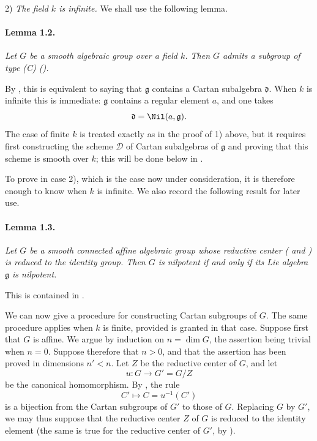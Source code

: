 \medskip
\noindent\textup{2\textdegree)} \emph{The field \(k\) is infinite.}
We shall use the following lemma.

\paragraph{\textbf{Lemma 1.2.}}
\emph{Let \(G\) be a smooth algebraic group over a field \(k\).
Then \(G\) admits a subgroup of type \textup{(C)}
\textup{()}.}

By , this is equivalent to saying that \(\mathfrak g\)
contains a Cartan subalgebra \(\mathfrak d\). When \(k\) is infinite
this is immediate: \(\mathfrak g\) contains a regular element \(a\),
and one takes
\[
  \mathfrak d=\Nil(a,\mathfrak g).
\]
The case of finite \(k\) is treated exactly as in the proof of
\textup{1\textdegree)} above, but it requires first constructing the
scheme \(\mathcal D\) of Cartan subalgebras of \(\mathfrak g\) and
proving that this scheme is smooth over \(k\); this will be done
below in .

To prove  in case \textup{2\textdegree)}, which is the case now
under consideration, it is therefore enough to know  when \(k\)
is infinite. We also record the following result for later use.

\paragraph{\textbf{Lemma 1.3.}}
\emph{Let \(G\) be a smooth connected affine algebraic group whose
reductive center \textup{( and )} is reduced to the identity
group. Then \(G\) is nilpotent if and only if its Lie algebra
\(\mathfrak g\) is nilpotent.}

This is contained in .

We can now give a procedure for constructing Cartan subgroups of
\(G\). The same procedure applies when \(k\) is finite, provided
 is granted in that case. Suppose first that \(G\) is
affine. We argue by induction on \(n=\dim G\), the assertion being
trivial when \(n=0\). Suppose therefore that \(n>0\), and that the
assertion has been proved in dimensions \(n'<n\). Let \(Z\) be the
reductive center of \(G\), and let
\[
  u\colon G\longrightarrow G'=G/Z
\]
be the canonical homomorphism. By , the rule
\[
  C'\longmapsto C=u^{-1}(C')
\]
is a bijection from the Cartan subgroups of \(G'\) to those of
\(G\). Replacing \(G\) by \(G'\), we may thus suppose that the
reductive center \(Z\) of \(G\) is reduced to the identity element
\textup{(the same is true for the reductive center of \(G'\), by
)}.

